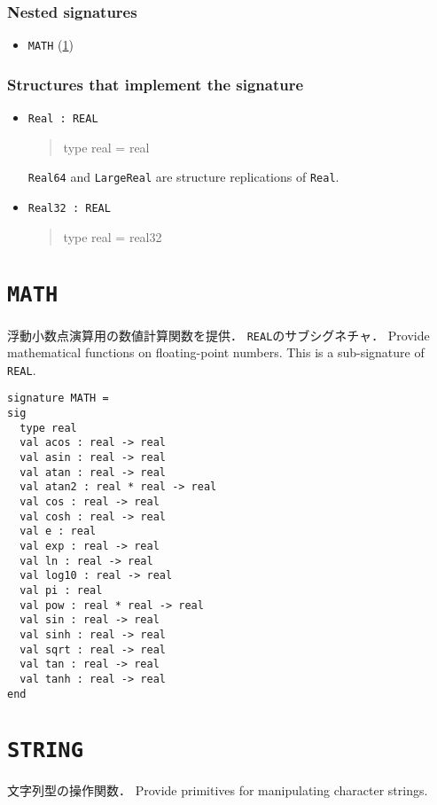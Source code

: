 \documentclass{jbook}
\newcommand{\txt}[2]{#2}
\newcommand{\code}[1]{\mbox{\large\tt #1}}
\newenvironment{program}{\begin{quote}\begin{tt}}%
                        {\end{tt}\end{quote}}
\newcommand{\signature}[2]{
\section{{\tt #1}}\label{section:reference:#2}
}
\newcommand{\sigref}[1]{\ref{section:reference:#1}}
\newcommand{\Structure}{\subsubsection*{\txt{シグネチャを実装するストラクチャ}{Structures that implement the signature}}}
\newcommand{\NestedSignature}{\subsubsection*{\txt{ネストしたシグネチャ}{Nested signatures}}}
\begin{document}
\NestedSignature
\begin{itemize}
\item \code{MATH} (\sigref{MATH})
\end{itemize}

\Structure
\begin{itemize}
\item \code{Real : REAL}
\begin{program}
   type real = real
\end{program}
\txt
{\code{Real64}と\code{LargeReal}は\code{Real}のストラクチャリプリケーション.}
{\code{Real64} and \code{LargeReal} are structure replications of \code{Real}.}
\item \code{Real32 : REAL}
\begin{program}
   type real = real32
\end{program}
\end{itemize}

\signature{MATH}{MATH}
\ifjp%
	浮動小数点演算用の数値計算関数を提供．
	\code{REAL}のサブシグネチャ．
\else%
	Provide mathematical functions on floating-point numbers.
	This is a sub-signature of \code{REAL}.
\fi%

\begin{verbatim}
signature MATH =
sig
  type real
  val acos : real -> real
  val asin : real -> real
  val atan : real -> real
  val atan2 : real * real -> real
  val cos : real -> real
  val cosh : real -> real
  val e : real
  val exp : real -> real
  val ln : real -> real
  val log10 : real -> real
  val pi : real
  val pow : real * real -> real
  val sin : real -> real
  val sinh : real -> real
  val sqrt : real -> real
  val tan : real -> real
  val tanh : real -> real
end
\end{verbatim}


\signature{STRING}{STRING}
\ifjp%
	文字列型の操作関数．
\else%
	Provide primitives for manipulating character strings.
\fi%
\end{document}
